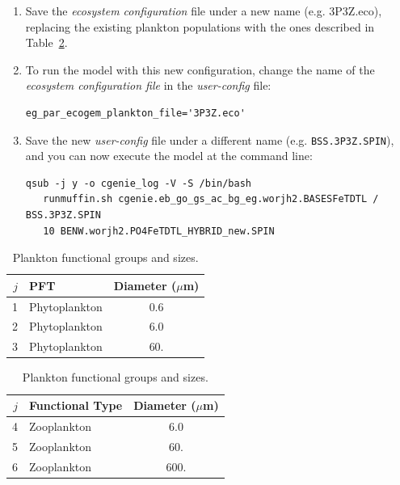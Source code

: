 \documentclass[11pt,fleqn]{book} %
\begin{document}
\vspace{2mm}
\begin{enumerate}[noitemsep]

\item Save the \textit{ecosystem configuration} file under a new name (e.g. \textsf{\small 3P3Z.eco}), replacing the existing plankton populations with the ones described in Table~\ref{planktonconfig1}.

\item  To run the model with this new configuration, change the name of the \textit{ecosystem configuration file} in the \textit{user-config} file:
\begin{verbatim}
eg_par_ecogem_plankton_file='3P3Z.eco'
\end{verbatim}

\item Save the new \textit{user-config} file under a different name (e.g. \texttt{BSS.3P3Z.SPIN}), and you can now execute the model at the command line:
\small\begin{verbatim}
qsub -j y -o cgenie_log -V -S /bin/bash 
   runmuffin.sh cgenie.eb_go_gs_ac_bg_eg.worjh2.BASESFeTDTL / BSS.3P3Z.SPIN
   10 BENW.worjh2.PO4FeTDTL_HYBRID_new.SPIN
\end{verbatim}\normalsize

\end{enumerate}
\vspace{2mm} 

\vspace{-4mm} 
\begin{table}[htp!]
\begin{center}
\caption{Plankton functional groups and sizes.}
\begin{tabular}{rlc}
\hline
$j$     & PFT                   & \multicolumn{1}{r}{Diameter ($\mu$m)}  \\
\hline
1       & Phytoplankton         & 0.6  \\
2       & Phytoplankton         & 6.0  \\
3       & Phytoplankton         & 60.  \\
\hline 
\end{tabular} 
\begin{tabular}{rlc}
\hline
$j$     & Functional Type       & \multicolumn{1}{r}{Diameter ($\mu$m)}  \\
\hline
4       & Zooplankton           & 6.0  \\
5       & Zooplankton           & 60.  \\
6       & Zooplankton           & 600.  \\
\hline 
\end{tabular} 
\label{planktonconfig1}
\end{center}
\end{table}
\vspace{-4mm} 
\end{document}
